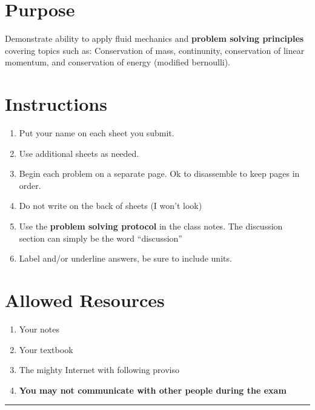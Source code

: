 \documentclass[12pt]{article}
\begin{document}
\section*{ }
\section*{Purpose}
Demonstrate ability to apply fluid mechanics and \textbf{problem solving principles} covering topics such as: Conservation of mass, continunity, conservation of linear momentum, and conservation of energy (modified bernoulli).
\section*{Instructions}
\begin{enumerate}
\item Put your name on each sheet you submit.  
\item Use additional sheets as needed. 
\item Begin each problem on a separate page.  Ok to disassemble to keep pages in order.
\item Do not write on the back of sheets (I won't look)
\item Use the \textbf{problem solving protocol} in the class notes.  The discussion section can simply be the word ``discussion'' 
\item Label and/or underline answers, be sure to include units.
\end{enumerate}
\section*{Allowed Resources}
\begin{enumerate}
\item Your notes
\item Your textbook
\item The mighty Internet with following proviso
\item  \textbf{You may not communicate with other people during the exam}
\end{enumerate}
\noindent\rule{\linewidth}{0.4pt}
\clearpage
\end{document}
